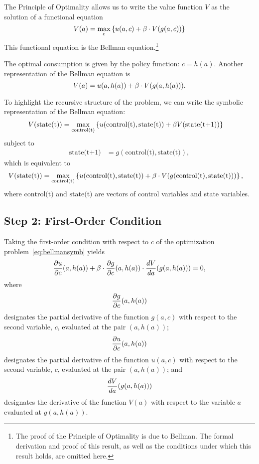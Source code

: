 \documentclass[letterpaper,12pt,leqno]{article}
\begin{document}
The Principle of Optimality allows us to write the value function $V$ as the solution of a functional equation
\begin{equation}
V(a)=\max_{c}\bc{u(a,c)+\b\cdot V(g(a,c))}\label{eq:bellmansymb}
\end{equation}
This functional equation is the Bellman equation.\footnote{The proof of the Principle of Optimality is due to Bellman. The formal derivation and proof of this result, as well as the conditions under which this result holds, are omitted here.} 

The optimal consumption is given by the policy function: $c=h(a)$. Another representation of the Bellman equation is 
\begin{equation}
V(a)=u(a,h(a))+\beta\cdot V(g(a,h(a))).\label{eq:bellmansymb2}
\end{equation}

To highlight the recursive structure of the problem, we can write the symbolic representation of
the Bellman equation:
\begin{align*}
V(\text{state(t)})&= \max_{\text{control(t)}}\bc{u(\text{control(t)},\text{state(t)})+\b V(\text{state(t+1)})}
\end{align*}
subject to
\begin{align*}
\text{state(t+1)}&=g(\text{control(t)},\text{state(t)}),
\end{align*}
which is equivalent to
\begin{align*}
V(\text{state(t)})&= \max_{\text{control(t)}}\bc{u(\text{control(t)},\text{state(t)})+\b \cdot  V(g(\text{control(t)},\text{state(t)}))},
\end{align*}
where $\text{control(t)}$ and $\text{state(t)}$ are vectors of control variables and state variables.


\subsection{Step 2: First-Order Condition}

Taking the first-order condition with respect to $c$ of the optimization problem~\eqref{eq:bellmansymb} yields 
\begin{equation}
\frac{\partial u}{\partial c}(a,h(a))+\beta \cdot  \frac{\partial g}{\partial c}(a,h(a)) \cdot \frac{d V}{d a}(g(a,h(a)))=0,\label{eq:focsymb}
\end{equation}
where
\[\frac{\partial g}{\partial c}(a,h(a))\]
designates the partial derivative of the function $g(a,c)$ with respect to the second variable, $c$, evaluated at the pair $(a,h(a))$;
\[\frac{\partial u}{\partial c}(a,h(a))\]
designates the partial derivative of the function $u(a,c)$ with respect to the second variable, $c$, evaluated at the pair $(a,h(a))$;
and 
\[\frac{d V}{d a}(g(a,h(a)))\]
designates the derivative of the function $V(a)$ with respect to the variable $a$ evaluated at $g(a,h(a))$.
\end{document}
